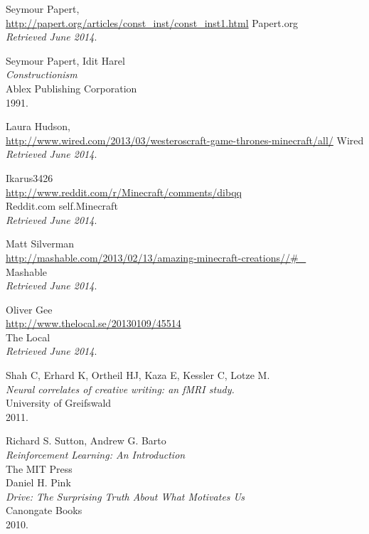 \begin{thebibliography}{99}
  Seymour Papert, \\
  \url{http://papert.org/articles/const_inst/const_inst1.html}
  Papert.org \\
  \emph{Retrieved June 2014}.

  Seymour Papert, Idit Harel \\
  \emph{Constructionism} \\
  Ablex Publishing Corporation \\
  1991.

  Laura Hudson, \\
  \url{http://www.wired.com/2013/03/westeroscraft-game-thrones-minecraft/all/}
  Wired \\
  \emph{Retrieved June 2014}.

  Ikarus3426 \\
  \url{http://www.reddit.com/r/Minecraft/comments/dibqq} \\
  Reddit.com self.Minecraft \\
  \emph{Retrieved June 2014}.  

  Matt Silverman \\
  \url{http://mashable.com/2013/02/13/amazing-minecraft-creations//#_} \\
  Mashable \\
  \emph{Retrieved June 2014}.

  Oliver Gee \\
  \url{http://www.thelocal.se/20130109/45514} \\
  The Local \\
  \emph{Retrieved June 2014}.

  Shah C, Erhard K, Ortheil HJ, Kaza E, Kessler C, Lotze M. \\
  \emph{Neural correlates of creative writing: an fMRI study.} \\
  University of Greifswald \\
  2011.

  Richard S. Sutton, Andrew G. Barto \\
  \emph{Reinforcement Learning: An Introduction } \\
  The MIT Press \\

  Daniel H. Pink \\
  \emph{Drive: The Surprising Truth About What Motivates Us} \\
  Canongate Books \\
  2010.


\end{thebibliography}
